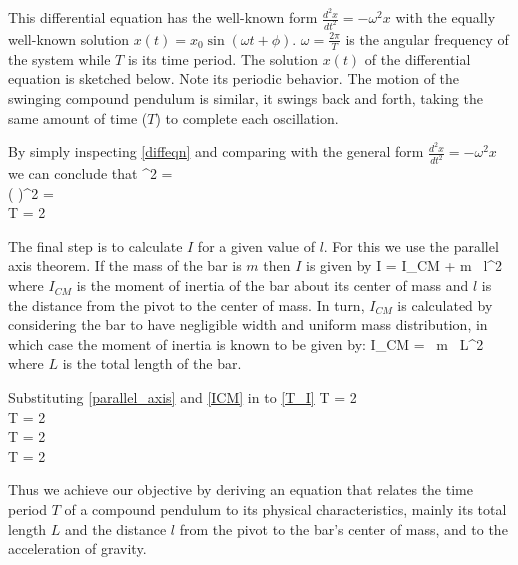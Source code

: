   This differential equation has the well-known form $\frac{d^2 x}{dt^2} = - \omega^2 x$ with the equally well-known solution $x(t) = x_0 \sin(\omega t + \phi)$. $\omega = \frac{2 \pi}{T}$ is the angular frequency of the system while $T$ is its time period. The solution $x(t)$ of the differential equation is sketched below. Note its periodic behavior. The motion of the swinging compound pendulum is similar, it swings back and forth, taking the same amount of time ($T$) to complete each oscillation.
   
   \vspace{0.5\baselineskip}
   
   \vspace{0.5\baselineskip}
   
   By simply inspecting \eqref{diffeqn} and comparing with the general form $\frac{d^2 x}{dt^2} = - \omega^2 x$ we can conclude that
   \beqc \label{T_I}
      \omega^2 = \\
      \imply \big(  \big)^2 = \\
      \imply T = 2 \pi {}
   \eeqc



   The final step is to calculate $I$ for a given value of $l$. For this we use the parallel axis theorem. If the mass of the bar is $m$ then $I$ is given by
   \beq \label{parallel_axis}
      I = I_{CM} + m \, l^2
   \eeq
   where $I_{CM}$ is the moment of inertia of the bar about its center of mass and $l$ is the distance from the pivot to the center of mass. In turn, $I_{CM}$ is calculated by considering the bar to have negligible width and uniform mass distribution, in which case the moment of inertia is known to be given by:
   \beq \label{ICM}
      I_{CM} =  \, m \, L^2
   \eeq
   where $L$ is the total length of the bar.

   Substituting \eqref{parallel_axis} and \eqref{ICM} in to \eqref{T_I}
   \beqc
      T = 2 \pi {}\\
      \imply T = 2 \pi {}\\
      \imply T = 2 \pi {}\\
      \imply T = 2 \pi {}
   \eeqc

   Thus we achieve our objective by deriving an equation that relates the time period $T$ of a compound pendulum to its physical characteristics, mainly its total length $L$ and the distance $l$ from the pivot to the bar's center of mass, and to the acceleration of gravity.
